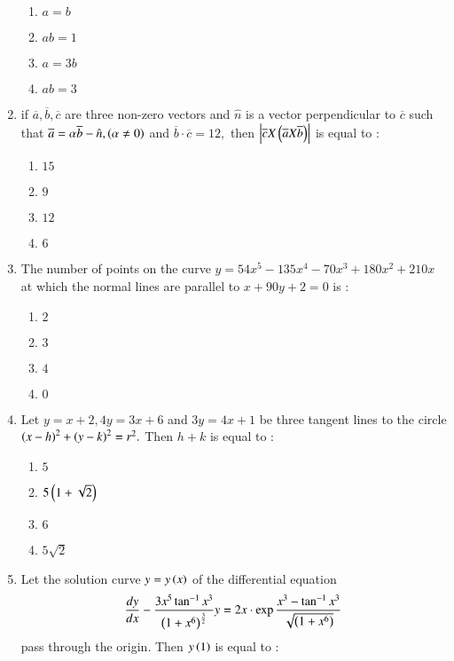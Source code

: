 \documentclass[journal,12pt,twocolumn]{IEEEtran}
\theoremstyle{remark}
\begin{document}
\begin{enumerate}
    \begin{enumerate}
        \item $a=b$
        \item $ab=1$
        \item $a=3b$
        \item $ab=3$
    \end{enumerate}
    \item if $\overline{a},\overline{b},\overline{c}$ are three non-zero vectors and $\hat{n}$ is a vector perpendicular to $\overline{c}$ such that $\overline{a}=\alpha\overline{b}-\hat{n},\left(\alpha\neq 0\right)$ and $\overline{b}\cdot\overline{c}=12,$ then $\left\vert\overline{c}X\left(\overline{a}X\overline{b}\right)\right\vert$ is equal to $:$\\
    \begin{enumerate}
        \item $15$
        \item $9$
        \item $12$
        \item $6$
    \end{enumerate}
    \item The number of points on the curve $y=54x^5-135x^4-70x^3+180x^2+210x$ at which the normal lines are parallel to $x+90y+2=0$ is $:$\\
    \begin{enumerate}
        \item $2$
        \item $3$
        \item $4$
        \item $0$
    \end{enumerate}
    \item Let $y=x+2,4y=3x+6$ and $3y=4x+1$ be three tangent lines to the circle $\left(x-h\right)^2+\left(y-k\right)^2=r^2.$ Then $h+k$ is equal to $:$\\
    \begin{enumerate}
        \item $5$
        \item $5\left(1+\sqrt{2}\right)$
        \item $6$
        \item $5\sqrt{2}$
    \end{enumerate}
    \item Let the solution curve $y=y\left(x\right)$ of the differential equation $$\frac{dy}{dx}-\frac{3x^5\tan^{-1}x^3}{\left(1+x^6\right)^{\frac{3}{2}}}y=2x\cdot \exp{\frac{x^3-\tan^{-1}x^3}{\sqrt{\ensuremath{\left(1+x^6\right)}}}}$$ pass through the origin. Then $y\left(1\right)$ is equal to $:$\\

\end{enumerate}
\end{document}
